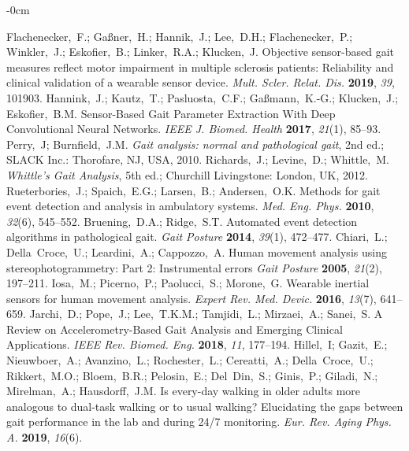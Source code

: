 \documentclass[sensors,article,submit,pdftex,moreauthors]{Definitions/mdpi}
\begin{document}
\begin{adjustwidth}{-\extralength}{0cm}
\begin{thebibliography}{999}
	Flachenecker,~F.; Ga{\ss}ner,~H.; Hannik,~J.; Lee,~D.H.; Flachenecker,~P.; Winkler,~J.; Eskofier,~B.; Linker,~R.A.; Klucken,~J. Objective sensor-based gait measures reflect motor impairment in multiple sclerosis patients: Reliability and clinical validation of a wearable sensor device. {\em Mult. Scler. Relat. Dis.} {\bf 2019}, {\em 39}, 101903.
	Hannink,~J.; Kautz,~T.; Pasluosta,~C.F.; Ga{\ss}mann,~K.-G.; Klucken,~J.; Eskofier,~B.M. Sensor-Based Gait Parameter Extraction With Deep Convolutional Neural Networks. {\em IEEE J. Biomed. Health} {\bf 2017}, {\em 21}(1), 85--93.
	Perry,~J; Burnfield,~J.M. \textit{Gait analysis: normal and pathological gait}, 2nd ed.; SLACK Inc.: Thorofare, NJ, USA, 2010.
	Richards,~J.; Levine,~D.; Whittle,~M. \textit{Whittle's Gait Analysis}, 5th ed.; Churchill Livingstone: London, UK, 2012.
	Rueterbories,~J.; Spaich,~E.G.; Larsen,~B.; Andersen,~O.K. Methods for gait event detection and analysis in ambulatory systems. {\em Med. Eng. Phys.} {\bf 2010}, {\em 32}(6), 545--552.
	Bruening,~D.A.; Ridge,~S.T. Automated event detection algorithms in pathological gait. {\em Gait Posture} {\bf 2014}, {\em 39}(1), 472--477.
	Chiari,~L.; Della~Croce,~U.; Leardini,~A.; Cappozzo,~A. Human movement analysis using stereophotogrammetry: Part 2: Instrumental errors {\em Gait Posture} {\bf 2005}, {\em 21}(2), 197--211.
	Iosa,~M.; Picerno,~P.; Paolucci,~S.; Morone,~G. Wearable inertial sensors for human movement analysis. {\em Expert Rev. Med. Devic.} {\bf 2016}, {\em 13}(7), 641--659.
	Jarchi,~D.; Pope,~J.; Lee,~T.K.M.; Tamjidi,~L.; Mirzaei,~A.; Sanei,~S. A Review on Accelerometry-Based Gait Analysis and Emerging Clinical Applications. {\em IEEE Rev. Biomed. Eng.} {\bf 2018}, {\em 11}, 177--194.
	Hillel,~I; Gazit,~E.; Nieuwboer,~A.; Avanzino,~L.; Rochester,~L.; Cereatti,~A.; Della~Croce,~U.; Rikkert,~M.O.; Bloem,~B.R.; Pelosin,~E.; Del~Din,~S.; Ginis,~P.; Giladi,~N.;  Mirelman,~A.; Hausdorff,~J.M. Is every-day walking in older adults more analogous to dual-task walking or to usual walking? Elucidating the gaps between gait performance in the lab and during 24/7 monitoring. {\em Eur. Rev. Aging Phys. A.} {\bf 2019}, {\em 16}(6).

\end{thebibliography}
\end{adjustwidth}
\end{document}
